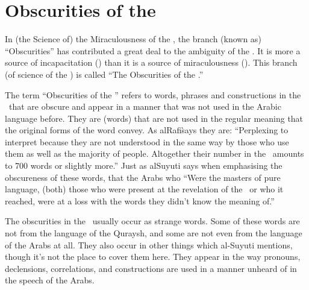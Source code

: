 \documentclass[12pt]{memoir}
\begin{document}
\section{Obscurities of the \Quran}

In (the Science of) the Miraculousness of the \Quran,
the branch (known as) “Obscurities”
has contributed a great deal to the ambiguity of the \Quran.
It is more a source of incapacitation ()
than it is a source of miraculousness ().
This branch (of science of the \Quran) is called
“The Obscurities of the \Quran.”\fnmarksym[*]


The term “Obscurities of the \Quran” refers to words,
phrases and constructions in the \Quran\ that are obscure
and appear in a manner that was not used in the Arabic language before.
They are (words) that are not used in the regular meaning
that the original forms of the word convey.
As al\–Rafi\` says they are: “Perplexing to interpret
because they are not understood in the same way by those
who use them as well as the majority of people.
Altogether their number in the \Quran\
amounts to 700 words or slightly more.”\fnmark\@
{}
Just as al\–Suyuti says when emphasising the obscureness of these words,
that the Arabs who “Were the masters of pure language,
(both) those who were present at the revelation of the \Quran\
or who it reached, were at a loss with the words
they didn’t know the meaning of.”\fnmark


The obscurities in the \Quran\ usually occur as strange words.
Some of these words are not from the language of the Quraysh,
and some are not even from the language of the Arabs at all.
They also occur in other things which al-Suyuti mentions,
though it’s not the place to cover them here.
They appear in the way pronouns, declensions, correlations,
and constructions are used in a manner unheard of in the speech of the Arabs.
\end{document}
